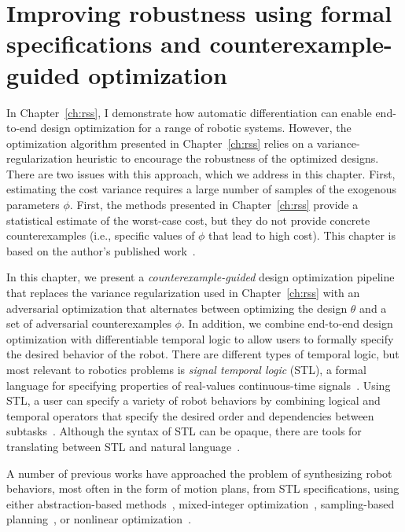 \newcommand{\ieeecopyright}{\copyright 2022 IEEE}

\chapter{Improving robustness using formal specifications and counterexample-guided optimization}\label{ch:iros}

In Chapter~\ref{ch:rss}, I demonstrate how automatic differentiation can enable end-to-end design optimization for a range of robotic systems. However, the optimization algorithm presented in Chapter~\ref{ch:rss} relies on a variance-regularization heuristic to encourage the robustness of the optimized designs. There are two issues with this approach, which we address in this chapter. First, estimating the cost variance requires a large number of samples of the exogenous parameters $\phi$. First, the methods presented in Chapter~\ref{ch:rss} provide a statistical estimate of the worst-case cost, but they do not provide concrete counterexamples (i.e., specific values of $\phi$ that lead to high cost). This chapter is based on the author's published work~\cite{dawsonRobustCounterexampleguidedOptimization2022b}.

In this chapter, we present a \textit{counterexample-guided} design optimization pipeline that replaces the variance regularization used in Chapter~\ref{ch:rss} with an adversarial optimization that alternates between optimizing the design $\theta$ and a set of adversarial counterexamples $\phi$. In addition, we combine end-to-end design optimization with differentiable temporal logic to allow users to formally specify the desired behavior of the robot. There are different types of temporal logic, but most relevant to robotics problems is \textit{signal temporal logic} (STL), a formal language for specifying properties of real-values continuous-time signals~\cite{donzeBreachToolboxVerification2010,sunMultiagentMotionPlanning2022,pantSmoothOperatorControl2017}. Using STL, a user can specify a variety of robot behaviors by combining logical and temporal operators that specify the desired order and dependencies between subtasks~\cite{plakuMotionPlanningTemporallogic2016,sunMultiagentMotionPlanning2022,takanoContinuousOptimizationBasedTask2021}. Although the syntax of STL can be opaque, there are tools for translating between STL and natural language~\cite{chenNL2TLTransformingNatural2023}.

A number of previous works have approached the problem of synthesizing robot behaviors, most often in the form of motion plans, from STL specifications, using either abstraction-based methods~\cite{plakuMotionPlanningTemporallogic2016}, mixed-integer optimization~\cite{sunMultiagentMotionPlanning2022,yangSynthesisguidedAdversarialScenario2021}, sampling-based planning~\cite{kantaros20,vasile17}, or nonlinear optimization~\cite{pantFlybyLogicControlMultiDrone2018,pantazidesSatelliteMissionPlanning2022,leungBackPropagationSignalTemporal2021}.

